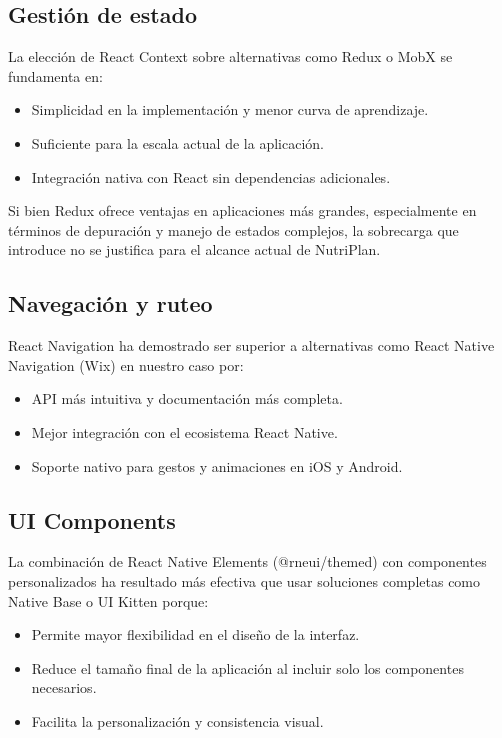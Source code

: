 \documentclass[twoside, openright, 11pt]{report}
\begin{document}
\begin{enumerate}
	\subsection*{Gestión de estado}
	La elección de React Context sobre alternativas como Redux o MobX se fundamenta en:
	\begin{itemize}
		\item Simplicidad en la implementación y menor curva de aprendizaje.
		\item Suficiente para la escala actual de la aplicación.
		\item Integración nativa con React sin dependencias adicionales.
	\end{itemize}
	
	Si bien Redux ofrece ventajas en aplicaciones más grandes, especialmente en términos de depuración y manejo de estados complejos, la sobrecarga que introduce no se justifica para el alcance actual de NutriPlan.
	
	\subsection*{Navegación y ruteo}
	React Navigation ha demostrado ser superior a alternativas como React Native Navigation (Wix) en nuestro caso por:
	\begin{itemize}
		\item API más intuitiva y documentación más completa.
		\item Mejor integración con el ecosistema React Native.
		\item Soporte nativo para gestos y animaciones en iOS y Android.
	\end{itemize}
	
	\subsection*{UI Components}
	La combinación de React Native Elements (@rneui/themed) con componentes personalizados ha resultado más efectiva que usar soluciones completas como Native Base o UI Kitten porque:
	\begin{itemize}
		\item Permite mayor flexibilidad en el diseño de la interfaz.
		\item Reduce el tamaño final de la aplicación al incluir solo los componentes necesarios.
		\item Facilita la personalización y consistencia visual.
	\end{itemize}
	

\end{enumerate}
\end{document}
